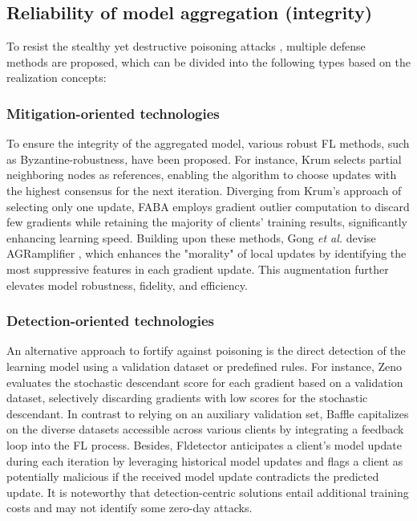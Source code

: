\documentclass[lettersize,journal]{IEEEtran}
\begin{document}
\subsection{Reliability of model aggregation (integrity)}%
To resist the stealthy yet destructive poisoning attacks \cite{lyu2023poisoning}, multiple defense methods are proposed, which can be divided into the following types based on the realization concepts:
\subsubsection{Mitigation-oriented technologies} 
To ensure the integrity of the aggregated model, various robust FL methods, such as Byzantine-robustness, have been proposed. For instance, Krum \cite{blanchard2017machine-krum} selects partial neighboring nodes as references, enabling the algorithm to choose updates with the highest consensus for the next iteration. Diverging from Krum's approach of selecting only one update, FABA \cite{xia2019faba} employs gradient outlier computation to discard few gradients while retaining the majority of clients' training results, significantly enhancing learning speed. Building upon these methods, Gong \textit{et al.} devise AGRamplifier \cite{gong2023agramplifier}, which enhances the "morality" of local updates by identifying the most suppressive features in each gradient update. This augmentation further elevates model robustness, fidelity, and efficiency. 



\subsubsection{Detection-oriented technologies} 
An alternative approach to fortify against poisoning is the direct detection of the learning model using a validation dataset or predefined rules. For instance, Zeno \cite{xie2019zeno} evaluates the stochastic descendant score for each gradient based on a validation dataset, selectively discarding gradients with low scores for the stochastic descendant. In contrast to relying on an auxiliary validation set, Baffle \cite{andreina2021baffle} capitalizes on the diverse datasets accessible across various clients by integrating a feedback loop into the FL process. Besides, Fldetector \cite{zhang2022fldetector} anticipates a client's model update during each iteration by leveraging historical model updates and flags a client as potentially malicious if the received model update contradicts the predicted update. 
It is noteworthy that detection-centric solutions entail additional training costs and may not identify some zero-day attacks.
\end{document}
